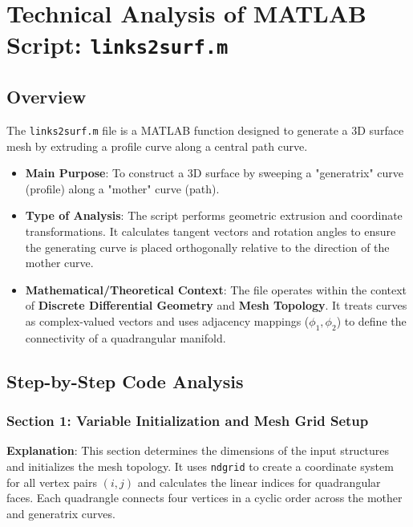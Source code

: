
\chapter{Technical Analysis of MATLAB Script: \texttt{links2surf.m}}
\author{}
\date{}


\maketitle

\section{Overview}

The \texttt{links2surf.m} file is a MATLAB function designed to generate a 3D surface mesh by extruding a profile curve along a central path curve.

\begin{itemize}
    \item \textbf{Main Purpose}: To construct a 3D surface by sweeping a "generatrix" curve (profile) along a "mother" curve (path).
    \item \textbf{Type of Analysis}: The script performs geometric extrusion and coordinate transformations. It calculates tangent vectors and rotation angles to ensure the generating curve is placed orthogonally relative to the direction of the mother curve.
    \item \textbf{Mathematical/Theoretical Context}: The file operates within the context of \textbf{Discrete Differential Geometry} and \textbf{Mesh Topology}. It treats curves as complex-valued vectors and uses adjacency mappings ($\phi_1, \phi_2$) to define the connectivity of a quadrangular manifold.
\end{itemize}

\section{Step-by-Step Code Analysis}

\subsection{Section 1: Variable Initialization and Mesh Grid Setup}
\textbf{Explanation}: This section determines the dimensions of the input structures and initializes the mesh topology. It uses 
\texttt{ndgrid} to create a coordinate system for all vertex pairs $(i, j)$ and calculates the linear indices for quadrangular faces. Each quadrangle connects four vertices in a cyclic order across the mother and generatrix curves.

